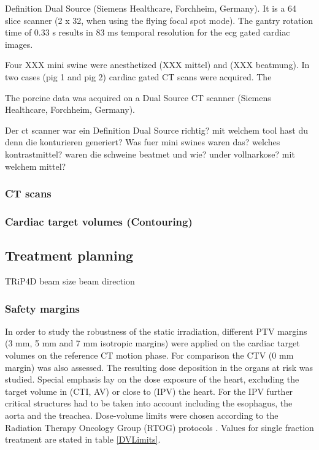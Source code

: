 \documentclass[type=dr, dr=rernat, accentcolor=tud7b,colorbacktitle, bigchapter, openright, twoside, 12pt ]{tudthesis}
\begin{document}
Definition Dual Source (Siemens Healthcare, Forchheim, Germany).  It is a 64 slice scanner (2 x 32, when using the flying focal spot mode). The gantry rotation time of 0.33 s results in 83 ms temporal resolution for the ecg gated cardiac images. 



Four XXX mini swine were anesthetized (XXX mittel) and (XXX beatmung). In two cases (pig 1 and pig 2) cardiac gated CT scans were acquired. 
The 

The porcine data was acquired on a Dual Source CT scanner (Siemens Healthcare, Forchheim, Germany). 


Der ct scanner war ein Definition Dual Source richtig? 
mit welchem tool hast du denn die konturieren generiert?
Was fuer mini swines waren das? 
welches kontrastmittel? 
waren die schweine beatmet und wie? 
under vollnarkose? mit welchem mittel?

\subsubsection{CT scans}
\subsubsection{Cardiac target volumes (Contouring)}

\subsection{Treatment planning}

TRiP4D
beam size
beam direction

\subsubsection{Safety margins}

In order to study the robustness of the static irradiation, different PTV margins (3 mm, 5 mm and 7 mm isotropic margins) were applied on the 
cardiac target volumes on the reference CT motion phase. For comparison the CTV (0 mm margin) was also assessed. The resulting dose deposition 
in the organs at risk was studied. Special emphasis lay on the dose exposure of the heart, excluding the target volume in (CTI, AV) or close 
to (IPV) the heart. For the IPV further critical structures had to be taken into account including the esophagus, the aorta and the treachea. 
Dose-volume limits were chosen according to the Radiation Therapy Oncology Group (RTOG) protocols \cite{RTOG0631} \cite{RTOG0915}. Values for 
single fraction treatment are stated in table \ref{DVLimits}. 
\end{document}
